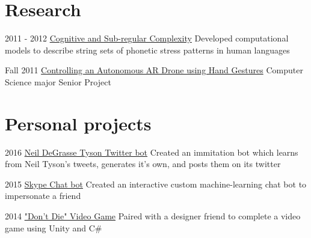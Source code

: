 \documentclass{tccv}
\begin{document}
\section{Research}

\begin{yearlist}
\item{2011 - 2012}
     {\href{http://link.springer.com/chapter/10.1007/978-3-642-39998-5_6\#page-1}{Cognitive and Sub-regular Complexity}}
     {Developed computational models to describe string sets of phonetic stress patterns in human languages}

\item{Fall 2011}
     {\href{https://www.youtube.com/watch?v=69phrToFKyI}{Controlling an Autonomous AR Drone using Hand Gestures}}
     {Computer Science major Senior Project}
\end{yearlist}

\section{Personal projects}

\begin{yearlist}

\item{2016}
     {\href{https://twitter.com/neiltyson_bot}{Neil DeGrasse Tyson Twitter bot}}
     {Created an immitation bot which learns from Neil Tyson's tweets, generates it's own, and posts them on its twitter}

\item{2015}
     {\href{https://github.com/apophis981/skype_bot}{Skype Chat bot}}
     {Created an interactive custom machine-learning chat bot to impersonate a friend}

\item{2014}
     {\href{https://github.com/apophis981/game_dev/tree/master/select_an_object}{"Don't Die" Video Game}}
     {Paired with a designer friend to complete a video game using Unity and C\#}
\end{yearlist}
\end{document}
